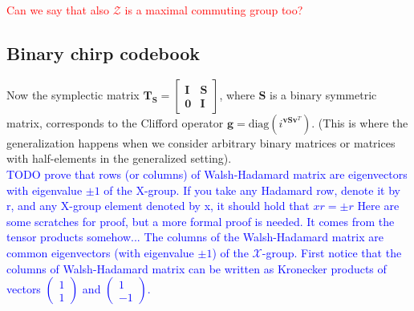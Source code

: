 \documentclass{article}
\begin{document}
	\textcolor{red}{Can we say that also $\mathcal{Z}$ is a maximal commuting group too?}
	
	
	\subsection*{Binary chirp codebook}
	Now the symplectic matrix $\mathbf{T}_\mathbf{S} = \begin{bmatrix} \mathbf{I} & \mathbf{S} \\ \mathbf{0} & \mathbf{I} \end{bmatrix}$, where $\mathbf{S}$ is a binary symmetric matrix, corresponds to the Clifford operator $\mathbf{g} = \text{diag}(i^{\mathbf{v}\mathbf{S}\mathbf{v}^T})$. (This is where the generalization happens when we consider arbitrary binary matrices or matrices with half-elements in the generalized setting). \\
	
	\textcolor{blue}{
		TODO prove that rows (or columns) of Walsh-Hadamard matrix are eigenvectors with eigenvalue $\pm 1$ of the X-group. If you take any Hadamard row, denote it by r, and any X-group element denoted by x, 
		it should hold that $xr = \pm r$ 
	}
	\textcolor{blue}{
		Here are some scratches for proof, but a more formal proof is needed. It comes from the tensor products somehow...
	}
	\textcolor{blue}{	
		The columns of the Walsh-Hadamard matrix are common eigenvectors (with eigenvalue $\pm 1$) of the $\mathcal{X}$-group. First notice that the columns of Walsh-Hadamard matrix can be written as Kronecker products of vectors $\begin{pmatrix} 1 \\ 1 \end{pmatrix}$ and $\begin{pmatrix} 1 \\ -1 \end{pmatrix}$.
	}
	
\end{document}
